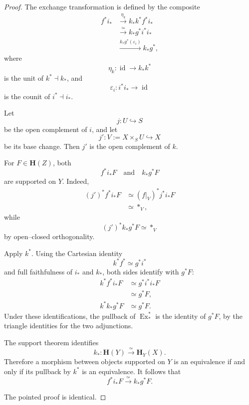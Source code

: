 \begin{proof}
The exchange transformation is defined by the composite
\[
\begin{aligned}
    f^*i_*
    &\xrightarrow{\eta_k}
    k_*k^*f^*i_*
    \\
    &\xrightarrow{\simeq}
    k_*g^*i^*i_*
    \\
    &\xrightarrow{
        k_*g^*(\varepsilon_i)
    }
    k_*g^*,
\end{aligned}
\]
where
\[
    \eta_k
    \colon
    \operatorname{id}
    \longrightarrow
    k_*k^*
\]
is the unit of \(k^*\dashv k_*\), and
\[
    \varepsilon_i
    \colon
    i^*i_*
    \longrightarrow
    \operatorname{id}
\]
is the counit of \(i^*\dashv i_*\).

Let
\[
    j
    \colon
    U
    \hookrightarrow
    S
\]
be the open complement of \(i\), and let
\[
    j'
    \colon
    V
    :=
    X\times_SU
    \hookrightarrow
    X
\]
be its base change.  Then \(j'\) is the open complement of \(k\).

For \(F\in\mathbf H(Z)\), both
\[
    f^*i_*F
    \quad\text{and}\quad
    k_*g^*F
\]
are supported on \(Y\).  Indeed,
\[
\begin{aligned}
    (j')^*f^*i_*F
    &\simeq
    (f|_V)^*j^*i_*F
    \\
    &\simeq
    *_V,
\end{aligned}
\]
while
\[
    (j')^*k_*g^*F
    \simeq
    *_V
\]
by open--closed orthogonality.

Apply \(k^*\).  Using the Cartesian identity
\[
    k^*f^*
    \simeq
    g^*i^*
\]
and full faithfulness of \(i_*\) and \(k_*\), both sides identify with
\(g^*F\):
\[
\begin{aligned}
    k^*f^*i_*F
    &\simeq
    g^*i^*i_*F
    \\
    &\simeq
    g^*F,
    \\
    k^*k_*g^*F
    &\simeq
    g^*F.
\end{aligned}
\]
Under these identifications, the pullback of
\(\operatorname{Ex}^{*}_{*}\) is the identity of \(g^*F\), by the
triangle identities for the two adjunctions.

The support theorem identifies
\[
    k_*
    \colon
    \mathbf H(Y)
    \xrightarrow{\simeq}
    \mathbf H_Y(X).
\]
Therefore a morphism between objects supported on \(Y\) is an
equivalence if and only if its pullback by \(k^*\) is an equivalence.
It follows that
\[
    f^*i_*F
    \xrightarrow{\simeq}
    k_*g^*F.
\]

The pointed proof is identical.
\end{proof}

